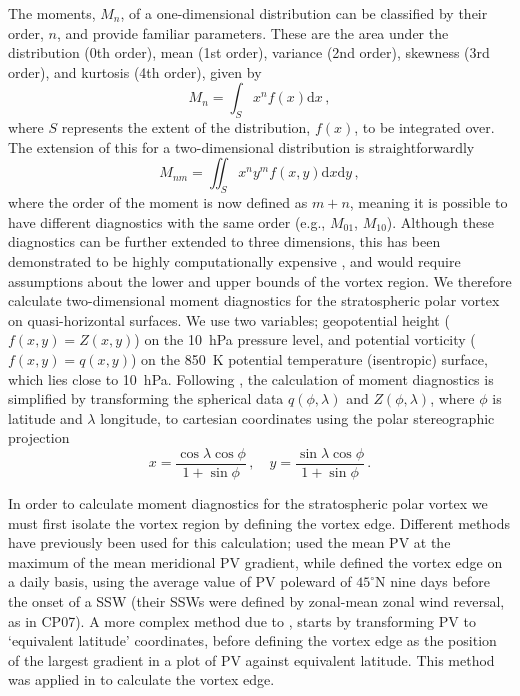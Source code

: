 The moments, $M_{n}$, of a one-dimensional distribution can be classified by
their order, $n$, and provide familiar parameters. These are the area under the
distribution (0th order), mean (1st order), variance (2nd order), skewness (3rd
order), and kurtosis (4th order), given by
\begin{equation}
M_{n} = \int_{S} x^{n}f(x)\mathrm{d}x \, ,
\end{equation}
where $S$ represents the extent of the distribution, $f(x)$, to be integrated
over. The extension of this for a two-dimensional distribution is
straightforwardly
\begin{equation}
M_{nm} = \iint_{S} x^{n}y^{m}f(x,y)\mathrm{d}x\mathrm{d}y \, ,
\label{eq:2D_moment}
\end{equation}
where the order of the moment is now defined as $m+n$, meaning it is possible to
have different diagnostics with the same order (e.g., $M_{01}$,
$M_{10}$). Although these diagnostics can be further extended to three
dimensions, this has been demonstrated to be highly computationally expensive
\citep{Li1994}, and would require assumptions about the lower and upper bounds
of the vortex region. We therefore calculate two-dimensional moment diagnostics
for the stratospheric polar vortex on quasi-horizontal surfaces. We use two
variables; geopotential height ($f(x,y) = Z(x,y)$) on the 10~hPa pressure level,
and potential vorticity ($f(x,y) = q(x,y)$) on the 850~K potential temperature
(isentropic) surface, which lies close to 10~hPa. Following \citet{Waugh1997},
the calculation of moment diagnostics is simplified by transforming the
spherical data $q(\phi,\lambda)$ and $Z(\phi,\lambda)$, where $\phi$ is latitude
and $\lambda$ longitude, to cartesian coordinates using the polar stereographic
projection
\begin{equation}
x = \frac{\cos\lambda\cos\phi}{1 + \sin\phi}\, , \quad
y = \frac{\sin\lambda\cos\phi}{1 + \sin\phi}\, .
\end{equation}  


In order to calculate moment diagnostics for the stratospheric polar vortex we
must first isolate the vortex region by defining the vortex edge. Different
methods have previously been used for this calculation; \citet{Waugh1999} used
the mean PV at the maximum of the mean meridional PV gradient, while
\citet{Matthewman2009} defined the vortex edge on a daily basis, using the
average value of PV poleward of $45^{\circ}$N nine days before the onset of a
SSW (their SSWs were defined by zonal-mean zonal wind reversal, as in CP07). A
more complex method due to \citet{Nash1996}, starts by transforming PV to
`equivalent latitude' \citep{Butchart1986} coordinates, before defining the
vortex edge as the position of the largest gradient in a plot of PV against
equivalent latitude. This method was applied in \citet{Mitchell2011} to
calculate the vortex edge. 

